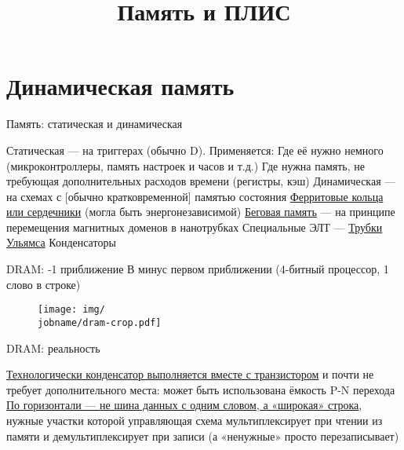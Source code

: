 \documentclass[xetex,aspectratio=43]{beamer}
\title{Память и ПЛИС}
\begin{document}
    \titleslide

    \tocslide

\section{Динамическая память}

\begin{frame}{Память: статическая и динамическая}
    \begin{outline}[itemize]
        \1 Статическая --- на триггерах (обычно D). Применяется:
            \2 Где её нужно немного (микроконтроллеры, память настроек и часов и т.д.)
            \2 Где нужна память, не требующая дополнительных расходов времени (регистры, кэш)
        \1 Динамическая --- на схемах с [обычно кратковременной] памятью состояния
            \2 \href{https://en.wikipedia.org/wiki/Magnetic-core_memory}{Ферритовые кольца или сердечники} (могла быть энергонезависимой)
            \2 \href{https://en.wikipedia.org/wiki/Racetrack_memory}{Беговая память} --- на принципе перемещения магнитных доменов в нанотрубках
            \2 Специальные ЭЛТ --- \href{https://en.wikipedia.org/wiki/Williams_tube}{Трубки Ульямса}
            \2 Конденсаторы
    \end{outline}
\end{frame}

\begin{frame}{DRAM: -1 приближение}
    \alert{В минус первом приближении (4-битный процессор, 1 слово в строке)}

    \begin{figure}
        \texttt{[image: img/\\jobname/dram-crop.pdf]}
        \vspace{-20mm}
    \end{figure}

\end{frame}

\begin{frame}{DRAM: реальность}
    \begin{outline}[itemize]
        \1  \href{https://en.wikipedia.org/wiki/Dynamic_random-access_memory\#History}{Технологически конденсатор выполняется вместе с транзистором} и почти не
        требует дополнительного места: может быть использована ёмкость P-N
        перехода
        \pause
        \1 \href{https://en.wikipedia.org/wiki/Dynamic_random-access_memory\#To_write_to_memory}{По горизонтали --- не шина данных с одним словом, а «широкая» строка}, нужные участки которой управляющая схема мультиплексирует при чтении из памяти и демультиплексирует при записи (а «ненужные» просто перезаписывает)
    \end{outline}
\end{frame}
\end{document}
